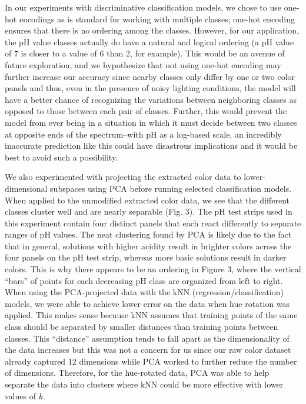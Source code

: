 \documentclass[journal]{IEEEtran}
\begin{document}
In our experiments with discriminative classification models, we chose to use one-hot encodings as is standard for working with multiple classes; one-hot encoding ensures that there is no ordering among the classes. However, for our application, the pH value classes actually do have a natural and logical ordering (a pH value of 7 is closer to a value of 6 than 2, for example). This would be an avenue of future exploration, and we hypothesize that not using one-hot encoding may further increase our accuracy since nearby classes only differ by one or two color panels and thus, even in the presence of noisy lighting conditions, the model will have a better chance of recognizing the variations between neighboring classes as opposed to those between each pair of classes. Further, this would prevent the model from ever being in a situation in which it must decide between two classes at opposite ends of the spectrum--with pH as a log-based scale, an incredibly inaccurate prediction like this could have disastrous implications and it would be best to avoid such a possibility.

We also experimented with projecting the extracted color data to lower-dimensional subspaces using PCA before running selected classification models. When applied to the unmodified extracted color data, we see that the different classes cluster well and are nearly separable (Fig. 3). The pH test strips used in this experiment contain four distinct panels that each react differently to separate ranges of pH values. The neat clustering found by PCA is likely due to the fact that in general, solutions with higher acidity result in brighter colors across the four panels on the pH test strip, whereas more basic solutions result in darker colors. This is why there appears to be an ordering in Figure 3, where the vertical “bars” of points for each decreasing pH class are organized from left to right. When using the PCA-projected data with the kNN (regression/classification) models, we were able to achieve lower error on the data when hue rotation was applied. This makes sense because kNN assumes that training points of the same class should be separated by smaller distances than training points between classes. This “distance” assumption tends to fall apart as the dimensionality of the data increases but this was not a concern for us since our raw color dataset already captured 12 dimensions while PCA worked to further reduce the number of dimensions. Therefore, for the hue-rotated data, PCA was able to help separate the data into clusters where kNN could be more effective with lower values of $k$. 
\end{document}

